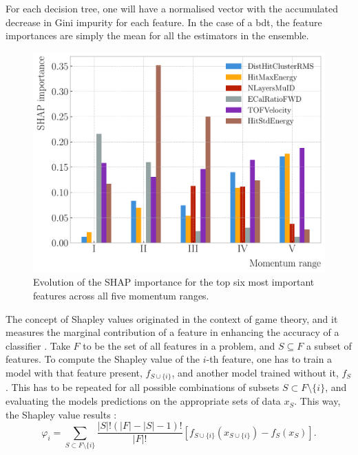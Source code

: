 For each decision tree, one will have a normalised vector with the accumulated decrease in Gini impurity for each feature. In the case of a \gls{bdt}, the feature importances are simply the mean for all the estimators in the ensemble.

\begin{figure}[t]
	\centering
	\includegraphics[width=.85\linewidth]{Images/GArSoft_PID/BDT/summary_top_six.pdf}
	\caption{Evolution of the SHAP importance for the top six most important features across all five momentum ranges.}
	\label{fig:bdt_shap_regions}
\end{figure}

The concept of Shapley values originated in the context of game theory, and it measures the marginal contribution of a feature in enhancing the accuracy of a classifier \cite{Shapley1951}. Take $F$ to be the set of all features in a problem, and $S \subseteq F$ a subset of features. To compute the Shapley value of the $i$-th feature, one has to train a model with that feature present, $f_{S \cup \{i\}}$, and another model trained without it, $f_{S}$. This has to be repeated for all possible combinations of subsets $S \subset F \setminus \{i\}$, and evaluating the models predictions on the appropriate sets of data $x_{S}$. This way, the Shapley value results \cite{SHAP2017}:
\begin{equation}
	\varphi_{i} = \sum_{S \subset F \setminus \{i\}} \frac{|S|!(|F|-|S|-1)!}{|F|!} \left[f_{S \cup \{i\}}(x_{S \cup \{i\}}) - f_{S}(x_{S})\right].
\end{equation}

